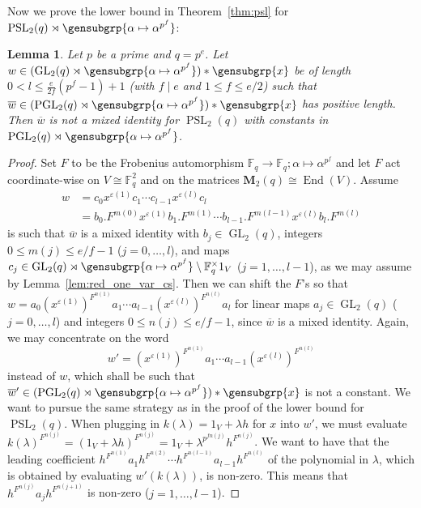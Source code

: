\documentclass[a4paper,11pt]{amsproc}
\newcommand{\finfield}{\mathbb{F}}%
\newcommand{\M}{\mathbf{M}}%
\DeclareMathOperator{\End}{End}%
\DeclareMathOperator{\GL}{GL}%
\DeclareMathOperator{\PSL}{PSL}%
\DeclareMathOperator{\PGL}{PGL}%
\theoremstyle{plain}
\newtheorem{lemma}{Lemma}[section]
\theoremstyle{definition}
\begin{document}
	Now we prove the lower bound in Theorem~\ref{thm:psl} for $\PSL_2(q)\rtimes\gensubgrp{\alpha\mapsto\alpha^{p^f}}$:
	
	\begin{lemma}\label{lem:lwr_bd_aut_ids_psl_2}
		Let $p$ be a prime and $q=p^e$. Let $w\in(\GL_2(q)\rtimes\gensubgrp{\alpha\mapsto\alpha^{p^f}})\ast\gensubgrp{x}$ be of length $0<l\leq\frac{e}{2f}(p^f-1)+1$ (with $f\mid e$ and $1\leq f\leq e/2$) such that $\overline{w}\in(\PGL_2(q)\rtimes\gensubgrp{\alpha\mapsto\alpha^{p^f}})\ast\gensubgrp{x}$ has positive length. Then $\overline{w}$ is not a mixed identity for $\PSL_2(q)$ with constants in $\PGL_2(q)\rtimes\gensubgrp{\alpha\mapsto\alpha^{p^f}}$.
	\end{lemma}
	
	\begin{proof}
		Set $F$ to be the Frobenius automorphism $\finfield_q\to\finfield_q; \alpha\mapsto\alpha^{p^f}$ and let $F$ act coordinate-wise on $V\cong\finfield_q^2$ and on the matrices $\M_2(q)\cong\End(V)$. Assume
		\begin{align*}
			w &= c_0 x^{\varepsilon(1)} c_1\cdots c_{l-1} x^{\varepsilon(l)} c_l\\
			&=b_0.F^{m(0)} x^{\varepsilon(1)} b_1.F^{m(1)}\cdots b_{l-1}.F^{m(l-1)} x^{\varepsilon(l)} b_l.F^{m(l)}
		\end{align*}
		is such that $\overline{w}$ is a mixed identity with $b_j\in\GL_2(q)$, integers $0\leq m(j)\leq e/f-1$ ($j=0,\ldots,l$), and maps $c_j\in\GL_2(q)\rtimes\gensubgrp{\alpha\mapsto\alpha^{p^f}}\setminus\finfield_q^\times 1_V$ ($j=1,\ldots,l-1$), as we may assume by Lemma~\ref{lem:red_one_var_cs}. Then we can shift the $F$'s so that $w=a_0 (x^{\varepsilon(1)})^{F^{n(1)}}a_1\cdots a_{l-1}(x^{\varepsilon(l)})^{F^{n(l)}}a_l$ for linear maps $a_j\in\GL_2(q)$ ($j=0,\ldots,l$) and integers $0\leq n(j)\leq e/f-1$, since $\overline{w}$ is a mixed identity. Again, we may concentrate on the word 
		$$
		w'=(x^{\varepsilon(1)})^{F^{n(1)}}a_1\cdots a_{l-1}(x^{\varepsilon(l)})^{F^{n(l)}}
		$$ 
		instead of $w$, which shall be such that $\overline{w}'\in(\PGL_2(q)\rtimes\gensubgrp{\alpha\mapsto\alpha^{p^f}})\ast\gensubgrp{x}$ is not a constant. We want to pursue the same strategy as in the proof of the lower bound for $\PSL_2(q)$. When plugging in $k(\lambda)=1_V+\lambda h$ for $x$ into $w'$, we must evaluate $k(\lambda)^{F^{n(j)}}=(1_V+\lambda h)^{F^{n(j)}}=1_V+\lambda^{p^{fn(j)}} h^{F^{n(j)}}$. We want to have that the leading coefficient $h^{F^{n(1)}}a_1 h^{F^{n(2)}}\cdots h^{F^{n(l-1)}}a_{l-1}h^{F^{n(l)}}$ of the polynomial in $\lambda$, which is obtained by evaluating $w'(k(\lambda))$, is non-zero. This means that $h^{F^{n(j)}}a_j h^{F^{n(j+1)}}$ is non-zero ($j=1,\ldots,l-1$). 
		

\end{proof}
\end{document}
